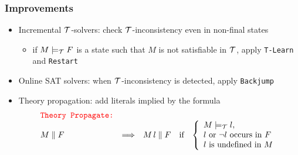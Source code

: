 \documentclass[smaller]{beamer}
\newcommand{\state}[2]{{#1\parallel #2}}
\def\cT{{\cal T}}
\newcommand{\red}[1]{\textcolor{red}{#1}}
\begin{document}
\begin{frame}
\frametitle{Improvements}
\begin{itemize}
\setlength\itemsep{2mm}
\item Incremental $\cT$-solvers: check $\cT$-inconsistency even in non-final states
\vspace{2mm}
	\begin{itemize}
	\setlength\itemsep{2mm}
	\item if $M\models_\cT F$ is a state such that $M$ is not satisfiable in $\cT$, apply {\tt T-Learn} and {\tt Restart}
	\end{itemize}
\item Online SAT solvers: when $\cT$-inconsistency is detected, apply {\tt Backjump}
\item Theory propagation: add literals implied by the formula
\[
\begin{array}{lclcl}
\red{\mbox{\tt Theory Propagate:}} \\
\state{M}{F}&\Longrightarrow& \state{M\,l}{F} &\mbox{if} &\left\{\begin{array}{l}
												      M\models_\cT l,\\
												      \mbox{$l$ or $\neg l$ occurs in $F$} \\
												      \mbox{$l$ is undefined in $M$} 							      								              \end{array}\right. 
\end{array}
\]
\end{itemize}
\end{frame}
\end{document}
